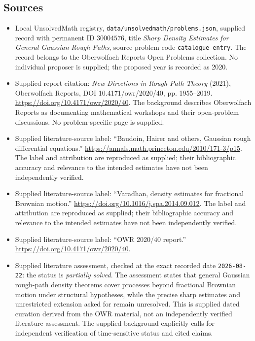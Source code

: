 \documentclass[11pt]{article}
\begin{document}
\subsection{Sources}
\begin{itemize}
\item Local UnsolvedMath registry, \texttt{data/unsolvedmath/problems.json}, supplied record with permanent ID \(30004576\), title \emph{Sharp Density Estimates for General Gaussian Rough Paths}, source problem code \texttt{catalogue entry}. The record belongs to the Oberwolfach Reports Open Problems collection. No individual proposer is supplied; the proposed year is recorded as 2020.
\item Supplied report citation: \emph{New Directions in Rough Path Theory} (2021), Oberwolfach Reports, DOI 10.4171/owr/2020/40, pp. 1955--2019. \url{https://doi.org/10.4171/owr/2020/40}. The background describes Oberwolfach Reports as documenting mathematical workshops and their open-problem discussions. No problem-specific page is supplied.
\item Supplied literature-source label: ``Baudoin, Hairer and others, Gaussian rough differential equations.'' \url{https://annals.math.princeton.edu/2010/171-3/p15}. The label and attribution are reproduced as supplied; their bibliographic accuracy and relevance to the intended estimates have not been independently verified.
\item Supplied literature-source label: ``Varadhan, density estimates for fractional Brownian motion.'' \url{https://doi.org/10.1016/j.spa.2014.09.012}. The label and attribution are reproduced as supplied; their bibliographic accuracy and relevance to the intended estimates have not been independently verified.
\item Supplied literature-source label: ``OWR 2020/40 report.'' \url{https://doi.org/10.4171/owr/2020/40}.
\item Supplied literature assessment, checked at the exact recorded date \texttt{2026-08-22}: the status is \emph{partially solved}. The assessment states that general Gaussian rough-path density theorems cover processes beyond fractional Brownian motion under structural hypotheses, while the precise sharp estimates and unrestricted extension asked for remain unresolved. This is supplied dated curation derived from the OWR material, not an independently verified literature assessment. The supplied background explicitly calls for independent verification of time-sensitive status and cited claims.
\end{itemize}
\end{document}

